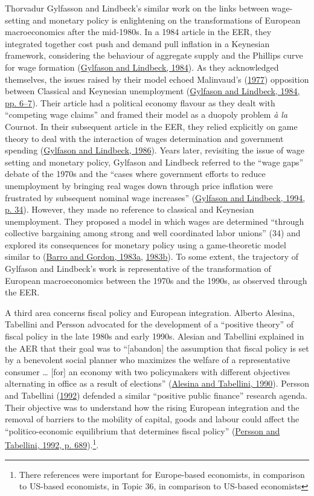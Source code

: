 \documentclass[
  12pt,
  onecolumn]{article}
\begin{document}
Thorvadur Gylfasson and Lindbeck's similar work on the links between
wage-setting and monetary policy is enlightening on the transformations
of European macroeconomics after the mid-1980s. In a 1984 article in the
EER, they integrated together cost push and demand pull inflation in a
Keynesian framework, considering the behaviour of aggregate supply and
the Phillips curve for wage formation
(\protect\hyperlink{ref-gylfason1984}{Gylfason and Lindbeck, 1984}). As
they acknowledged themselves, the issues raised by their model echoed
Malinvaud's (\protect\hyperlink{ref-malinvaud1977}{1977}) opposition
between Classical and Keynesian unemployment
(\protect\hyperlink{ref-gylfason1984}{Gylfason and Lindbeck, 1984, pp.
6--7}). Their article had a political economy flavour as they dealt with
``competing wage claims'' and framed their model as a duopoly problem
\emph{à la} Cournot. In their subsequent article in the EER, they relied
explicitly on game theory to deal with the interaction of wages
determination and government spending
(\protect\hyperlink{ref-gylfason1986}{Gylfason and Lindbeck, 1986}).
Years later, revisiting the issue of wage setting and monetary policy,
Gylfason and Lindbeck referred to the ``wage gaps'' debate of the 1970s
and the ``cases where government efforts to reduce unemployment by
bringing real wages down through price inflation were frustrated by
subsequent nominal wage increases''
(\protect\hyperlink{ref-gylfason1994}{Gylfason and Lindbeck, 1994, p.
34}). However, they made no reference to classical and Keynesian
unemployment. They proposed a model in which wages are determined
``through collective bargaining among strong and well coordinated labor
unions'' (34) and explored its consequences for monetary policy using a
game-theoretic model similar to (\protect\hyperlink{ref-barro1983}{Barro
and Gordon, 1983a}, \protect\hyperlink{ref-barro1983c}{1983b}). To some
extent, the trajectory of Gylfason and Lindbeck's work is representative
of the transformation of European macroeconomics between the 1970s and
the 1990s, as observed through the EER.

A third area concerns fiscal policy and European integration. Alberto
Alesina, Tabellini and Persson advocated for the development of a
``positive theory'' of fiscal policy in the late 1980s and early 1990s.
Alesian and Tabellini explained in the AER that their goal was to
``{[}abandon{]} the assumption that fiscal policy is set by a benevolent
social planner who maximizes the welfare of a representative consumer
\ldots{} {[}for{]} an economy with two policymakers with different
objectives alternating in office as a result of elections''
(\protect\hyperlink{ref-alesina1990}{Alesina and Tabellini, 1990}).
Persson and Tabellini (\protect\hyperlink{ref-persson1992}{1992})
defended a similar ``positive public finance'' research agenda. Their
objective was to understand how the rising European integration and the
removal of barriers to the mobility of capital, goods and labour could
affect the ``politico-economic equilibrium that determines fiscal
policy'' (\protect\hyperlink{ref-persson1992}{Persson and Tabellini,
1992, p. 689}).\footnote{There references were important for
  Europe-based economists, in comparison to US-based economists, in
  Topic 36, in comparison to US-based economists}.
\end{document}
